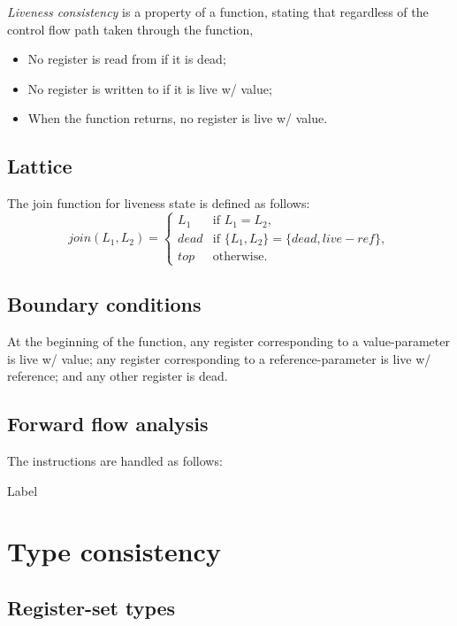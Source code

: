 \documentclass[a4paper]{report}
\begin{document}
\emph{Liveness consistency} is a property of a function, stating that
regardless of the control flow path taken through the function,
\begin{itemize}
\item No register is read from if it is dead;
\item No register is written to if it is live w/ value;
\item When the function returns, no register is live w/ value.
\end{itemize}


\subsection{Lattice}
The join function for liveness state is defined as follows:
\begin{equation*}
join(L_1, L_2) =
\begin{cases}
  L_1 & \text{if } L_1 = L_2,\\
  dead & \text{if } \{L_1,L_2\} = \{dead, live-ref\},\\
  top & \text{otherwise}.
\end{cases}
\end{equation*}

\subsection{Boundary conditions}
At the beginning of the function, any register corresponding to a
value-parameter is live w/ value; any register corresponding to a
reference-parameter is live w/ reference; and any other register is
dead.

\subsection{Forward flow analysis}
The instructions are handled as follows:
\begin{description}
\item[Label] 
\end{description}



\section{Type consistency}

\subsection{Register-set types}
\end{document}
